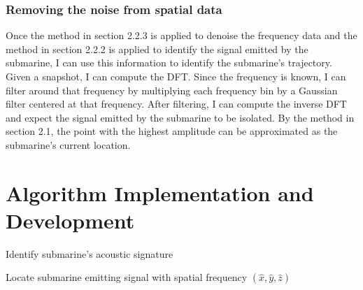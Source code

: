 \documentclass{article}
\begin{document}
\subsubsection{Removing the noise from spatial data}
Once the method in section 2.2.3 is applied to denoise the frequency data and the method in section 2.2.2 is applied to identify the signal emitted by the submarine, I can use this information to identify the submarine's trajectory. Given a snapshot, I can compute the DFT. Since the frequency is known, I can filter around that frequency by multiplying each frequency bin by a Gaussian filter centered at that frequency. After filtering, I can compute the inverse DFT and expect the signal emitted by the submarine to be isolated. By the method in section 2.1, the point with the highest amplitude can be approximated as the submarine's current location.



\section{Algorithm Implementation and Development}



\begin{algorithm}
\begin{algorithmic}

\ENDFOR
{}

\end{algorithmic}
\caption{Identify submarine's acoustic signature}
\label{alg:acoustic}
\end{algorithm}

\begin{algorithm}
\begin{algorithmic}
	\ENDFOR
\end{algorithmic}
\caption{Locate submarine emitting signal with spatial frequency $(\hat{x},\hat{y},\hat{z})$}
\label{alg:identify}
\end{algorithm}
\end{document}
